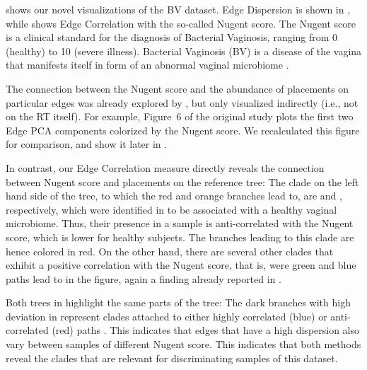  shows our novel visualizations of the \ac{BV} dataset.
Edge Dispersion is shown in ,
while  shows Edge Correlation with the so-called Nugent score. %
The Nugent score \cite{Nugent1991} is a clinical standard for the diagnosis of Bacterial Vaginosis,
ranging from \num{0} (healthy) to \num{10} (severe illness).
Bacterial Vaginosis (BV) is a disease of the vagina
that manifests itself in form of an abnormal vaginal microbiome \cite{Srinivasan2012}.

The connection between the Nugent score and the abundance of placements on particular edges
was already explored by , but only visualized indirectly (i.e., not on the \ac{RT} itself).
For example, Figure~6 of the original study plots the first two Edge PCA components colorized by the Nugent score.
We recalculated this figure for comparison, and show it later in .

In contrast, our Edge Correlation measure directly reveals
the connection between Nugent score and placements on the reference tree:
The clade on the left hand side of the tree, to which the red and orange branches lead to,
are  and , respectively,
which were identified in  to be associated with a healthy vaginal microbiome.
Thus, their presence in a sample is anti-correlated with the Nugent score, which is lower for healthy subjects.
The branches leading to this clade are hence colored in red.
On the other hand, there are several other clades that exhibit a positive correlation with the Nugent score,
that is, were green and blue paths lead to in the figure,
again a finding already reported in .

Both trees in  highlight the same parts of the tree:
The dark branches with high deviation in  represent clades
attached to either highly correlated (blue) or anti-correlated (red) paths .
This indicates that edges that have a high dispersion
also vary between samples of different Nugent score.
This indicates that both methods reveal the clades that are relevant for discriminating samples of this dataset.

